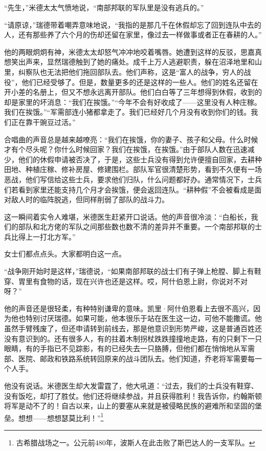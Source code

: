 \par “先生，”米德太太气愤地说，“南部邦联的军队里是没有逃兵的。”
\par “请原谅，”瑞德带着嘲弄意味地说，“我指的是那几千在休假却忘了回到连队中去的人，还有那些养了六个月的伤却还留在家里，像过去一样做事或者正在春耕的人。”
\par 他的两眼炯炯有神，米德太太却怒气冲冲地咬着嘴唇。她遭到这样的反驳，思嘉真想笑出声来，显然瑞德触到了她的痛处。成千上万人逃避职责，躲在沼泽地里和山里，纠察队也无法把他们拖回部队去。他们声称，这是“富人的战争，穷人的战役”，他们已经受够了。但是，数量更多的还是这样的一些人。他们的姓名还留在开小差的名册上，但又不想永远离开部队。他们白白等了三年想得到休假，收到的却是家里的坏消息：“我们在挨饿。”“今年不会有好收成了——这里没有人种庄稼。我们在挨饿。”“军需部连小猪都拿走了。我们已经好几个月没有收到你们的钱。我们正在靠干豌豆过活。”
\par 合唱曲的声音总是越来越嘹亮：“我们在挨饿，你的妻子、孩子和父母。什么时候才有个尽头呢？你什么时候回家？我们在挨饿，在挨饿。”由于部队人数在迅速减少，他们的休假申请被否决了，于是，这些士兵没有得到允许便擅自回家，去耕种田地、种植庄稼、修补房屋、修建围栏。部队军官很清楚形势，看到不久便有一场恶战，他们写信给这些士兵，要求他们归队，什么问题都好办。通常情况下，士兵们若看到家里还能支持几个月才会挨饿，便会返回连队。“耕种假”不会被看成是面对敌人时的临阵脱逃，但同样削弱了部队的战斗力。
\par 这一瞬间着实令人难堪，米德医生赶紧开口说话。他的声音很冷淡：“白船长，我们的部队和北方佬的军队之间那些数也数不清的差异并不重要。一个南部邦联的士兵比得上一打北方军。”
\par 女士们都点点头。大家都明白这一点。
\par “战争刚开始时是这样，”瑞德说，“如果南部邦联的战士们有子弹上枪膛、脚上有鞋穿、胃里有食物的话，现在兴许也还是这样。哎，阿什伯恩上尉，你说对不对呀？”
\par 他的声音还是很轻柔，有种特别谦卑的意味。凯里·阿什伯恩看上去很不高兴，因为他也特别讨厌瑞德。如果可能，他本很乐于站在医生这一边，可他不能撒谎。他虽然手臂残废了，但还申请转到前线去，那是他意识到形势严峻，这是普通百姓还没有意识到的。还有很多人，有的拄着木制拐杖跌跌撞撞地走路，有的只剩下一只眼睛，有的手指已不见踪影，有的已经失去一只胳膊，但他们都在悄悄地从军需部、医院、邮政和铁路系统转回原来的战斗团队去。他们知道，乔老将军需要每一个人手。
\par 他没有说话。米德医生却大发雷霆了，他大吼道：“过去，我们的士兵没有鞋穿、没有饭吃，却打了胜仗。他们还将继续参战，并且获得胜利！我告诉你，约翰斯顿将军是动不了的！自古以来，山上的要塞从来就是被侵略民族的避难所和坚固的堡垒。想想——想想瑟莫比利！”\footnote{古希腊战场之一。公元前480年，波斯人在此击败了斯巴达人的一支军队。}
